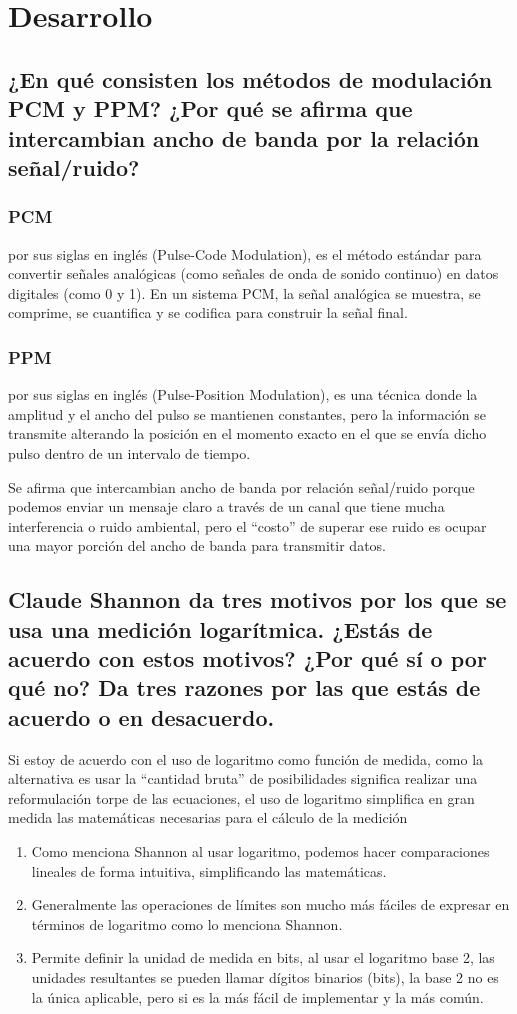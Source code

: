 \chapter{Desarrollo}

\section{¿En qué consisten los métodos de modulación PCM y PPM? ¿Por qué se afirma que intercambian ancho de banda por la relación señal/ruido?}
\subsection{PCM}
por sus siglas en inglés (Pulse-Code Modulation), es el método estándar para convertir señales analógicas (como señales de onda de sonido continuo) en datos digitales (como 0 y 1). En un sistema PCM, la señal analógica se muestra, se comprime, se cuantifica y se codifica para construir la señal final. 
\subsection{PPM}
por sus siglas en inglés (Pulse-Position Modulation), es una técnica donde la amplitud y el ancho del pulso se mantienen constantes, pero la información se transmite alterando la posición en el momento exacto en el que se envía dicho pulso dentro de un intervalo de tiempo.

\bigskip %
Se afirma que intercambian ancho de banda por relación señal/ruido porque podemos enviar un mensaje claro a través de un canal que tiene mucha interferencia o ruido ambiental, pero el “costo” de superar ese ruido es ocupar una mayor porción del ancho de banda para transmitir datos. 
\section{Claude Shannon da tres motivos por los que se usa una medición logarítmica. ¿Estás de acuerdo con estos motivos? ¿Por qué sí o por qué no? Da tres razones por las que estás de acuerdo o en desacuerdo.}
Si estoy de acuerdo con el uso de logaritmo como función de medida, como la alternativa es usar la “cantidad bruta” de posibilidades significa realizar una reformulación torpe de las ecuaciones, el uso de logaritmo simplifica en gran medida las matemáticas necesarias para el cálculo de la medición 
\begin{enumerate}
  \item Como menciona Shannon al usar logaritmo, podemos hacer comparaciones lineales de forma intuitiva, simplificando las matemáticas. 
  \item Generalmente las operaciones de límites son mucho más fáciles de expresar en términos de logaritmo como lo menciona Shannon. 
  \item Permite definir la unidad de medida en bits, al usar el logaritmo base 2, las unidades resultantes se pueden llamar dígitos binarios (bits), la base 2 no es la única aplicable, pero si es la más fácil de implementar y la más común. 
\end{enumerate}
